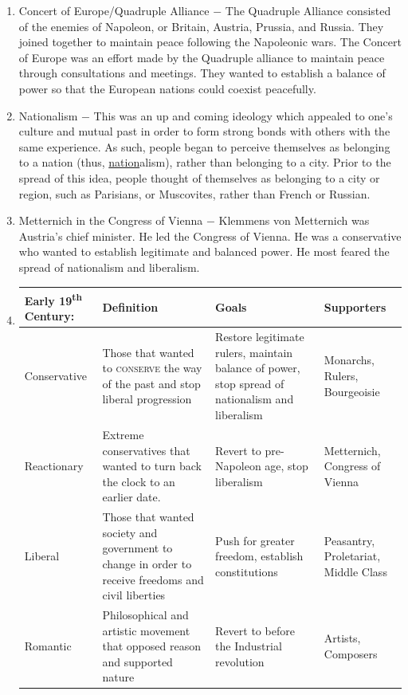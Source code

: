 \documentclass[12pt]{article}
\begin{document}
\begin{enumerate}
\item Concert of Europe/Quadruple Alliance $-$ The Quadruple Alliance consisted of the enemies of Napoleon, or Britain, Austria, Prussia, and Russia. They joined together to maintain peace following the Napoleonic wars. The Concert of Europe was an effort made by the Quadruple alliance to maintain peace through consultations and meetings. They wanted to establish a balance of power so that the European nations could coexist peacefully.

\item Nationalism $-$ This was an up and coming ideology which appealed to one's culture and mutual past in order to form strong bonds with others with the same experience. As such, people began to perceive themselves as belonging to a nation (thus, \underline{nation}alism), rather than belonging to a city. Prior to the spread of this idea, people thought of themselves as belonging to a city or region, such as Parisians, or Muscovites, rather than French or Russian.

\item Metternich in the Congress of Vienna $-$ Klemmens von Metternich was Austria's chief minister. He led the Congress of Vienna. He was a conservative who wanted to establish legitimate and balanced power. He most feared the spread of nationalism and liberalism.

\item \begin{tabular}{p{} p{} p{} p{}}

\hline  
Early 19\textsuperscript{th} Century: & Definition & Goals & Supporters \\
\hline
Conservative & Those that wanted to \textsc{conserve} the way of the past and stop liberal progression & Restore legitimate rulers, maintain balance of power, stop spread of nationalism and liberalism & Monarchs, Rulers, Bourgeoisie  \\
\hline
Reactionary & Extreme conservatives that wanted to turn back the clock to an earlier date. & Revert to pre-Napoleon age, stop liberalism & Metternich, Congress of Vienna  \\
\hline
Liberal & Those that wanted society and government to change in order to receive freedoms and civil liberties  & Push for greater freedom, establish constitutions  & Peasantry, Proletariat, Middle Class  \\
\hline
Romantic & Philosophical and artistic movement that opposed reason and supported nature  & Revert to before the Industrial revolution  & Artists, Composers  \\
\hline


\end{tabular}
\end{enumerate}
\end{document}
